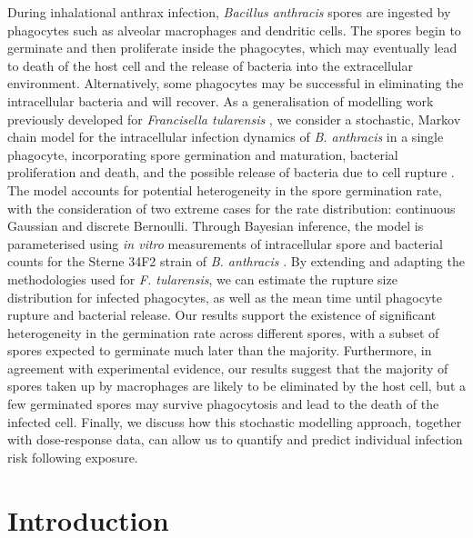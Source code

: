 \documentclass[11pt,a4paper]{article}
\begin{document}
During inhalational anthrax infection, \textit{Bacillus anthracis} spores are ingested by phagocytes such as alveolar macrophages and dendritic cells. The spores begin to germinate and then proliferate inside the phagocytes, which may eventually lead to death of the host cell and the release of bacteria into the extracellular environment. Alternatively, some phagocytes may be successful in eliminating the intracellular bacteria and will recover. As a generalisation of modelling work previously developed for \textit{Francisella tularensis} \cite{carruthers}, we consider a stochastic, Markov chain model for the intracellular infection dynamics of \textit{B. anthracis} in a single phagocyte, incorporating spore germination and maturation, bacterial proliferation and death, and the possible release of bacteria due to cell rupture \cite{williams}. The model accounts for potential heterogeneity in the spore germination rate, with the consideration of two extreme cases for the rate distribution: continuous Gaussian and discrete Bernoulli. Through Bayesian inference, the model is parameterised using \textit{in vitro} measurements of intracellular spore and bacterial counts for the Sterne 34F2 strain of \textit{B. anthracis} \cite{kang, pantha}. By extending and adapting the methodologies used for \textit{F. tularensis}, we can estimate the rupture size distribution for infected phagocytes, as well as the mean time until phagocyte rupture and bacterial release. Our results support the existence of significant heterogeneity in the germination rate across different spores, with a subset of spores expected to germinate much later than the majority. Furthermore, in agreement with experimental evidence, our results suggest that the majority of spores taken up by macrophages are likely to be eliminated by the host cell, but a few germinated spores may survive phagocytosis and lead to the death of the infected cell. Finally, we discuss how this stochastic modelling approach, together with dose-response data, can allow us to quantify and predict individual infection risk following exposure.

\section{Introduction}


 
\end{document}
